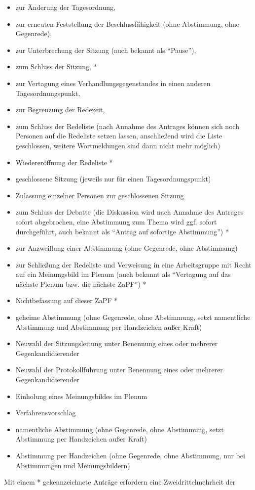 \documentclass[
  a4paper,
  oneside]{scrartcl}
\providecommand{\tightlist}{%
  \setlength{\itemsep}{0pt}\setlength{\parskip}{0pt}}
\begin{document}
\begin{enumerate}
  \begin{itemize}
  \tightlist
  \item
    zur Änderung der Tagesordnung,
  \item
    zur erneuten Feststellung der Beschlussfähigkeit (ohne Abstimmung,
    ohne Gegenrede),
  \item
    zur Unterbrechung der Sitzung (auch bekannt als ``Pause''),
  \item
    zum Schluss der Sitzung, *
  \item
    zur Vertagung eines Verhandlungsgegenstandes in einen anderen
    Tagesordnungspunkt,
  \item
    zur Begrenzung der Redezeit,
  \item
    zum Schluss der Redeliste (nach Annahme des Antrages können sich
    noch Personen auf die Redeliste setzen lassen, anschließend wird die
    Liste geschlossen, weitere Wortmeldungen sind dann nicht mehr
    möglich)
  \item
    Wiedereröffnung der Redeliste *
  \item
    geschlossene Sitzung (jeweils nur für einen Tagesordnungspunkt)
  \item
    Zulassung einzelner Personen zur geschlossenen Sitzung
  \item
    zum Schluss der Debatte (die Diskussion wird nach Annahme des
    Antrages sofort abgebrochen, eine Abstimmung zum Thema wird ggf.
    sofort durchgeführt, auch bekannt als ``Antrag auf sofortige
    Abstimmung'') *
  \item
    zur Anzweiflung einer Abstimmung (ohne Gegenrede, ohne Abstimmung)
  \item
    zur Schließung der Redeliste und Verweisung in eine Arbeitsgruppe
    mit Recht auf ein Meinungsbild im Plenum (auch bekannt als
    ``Vertagung auf das nächste Plenum bzw. die nächste ZaPF'') *
  \item
    Nichtbefassung auf dieser ZaPF *
  \item
    geheime Abstimmung (ohne Gegenrede, ohne Abstimmung, setzt
    namentliche Abstimmung und Abstimmung per Handzeichen außer Kraft)
  \item
    Neuwahl der Sitzungsleitung unter Benennung eines oder mehrerer
    Gegenkandidierender
  \item
    Neuwahl der Protokollführung unter Benennung eines oder mehrerer
    Gegenkandidierender
  \item
    Einholung eines Meinungsbildes im Plenum
  \item
    Verfahrensvorschlag
  \item
    namentliche Abstimmung (ohne Gegenrede, ohne Abstimmung, setzt
    Abstimmung per Handzeichen außer Kraft)
  \item
    Abstimmung per Handzeichen (ohne Gegenrede, ohne Abstimmung, nur bei
    Abstimmungen und Meinungsbildern)
  \end{itemize}

  Mit einem * gekennzeichnete Anträge erfordern eine Zweidrittelmehrheit
  der
\end{enumerate}
\end{document}
